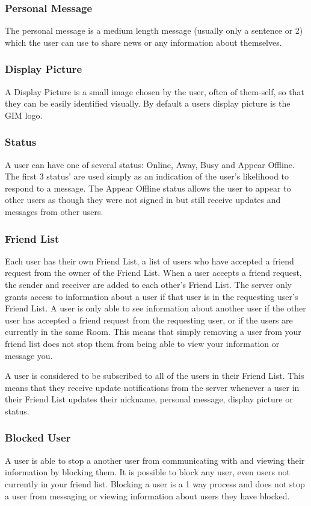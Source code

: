 \subsubsection{Personal Message}
The personal message is a medium length message (usually only a sentence or 2) which the user can use to share news or any information about themselves.

\subsubsection{Display Picture}
A Display Picture is a small image chosen by the user, often of them-self, so that they can be easily identified visually. By default a users display picture is the GIM logo. 

\subsubsection{Status}
A user can have one of several status: Online, Away, Busy and Appear Offline. The first 3 status' are used simply as an indication of the user's likelihood to respond to a message. The Appear Offline status allows the user to appear to other users as though they were not signed in but still receive updates and messages from other users.

\subsubsection{Friend List}
Each user has their own Friend List, a list of users who have accepted a friend request from the owner of the Friend List. When a user accepts a friend request, the sender and receiver are added to each other's Friend List. The server only grants access to information about a user if that user is in the requesting user's Friend List. A user is only able to see information about another user if the other user has accepted a friend request from the requesting user, or if the users are currently in the same Room. This means that simply removing a user from your friend list does not stop them from being able to view your information or message you. 

A user is considered to be subscribed to all of the users in their Friend List. This means that they receive update notifications from the server whenever a user in their Friend List updates their nickname, personal message, display picture or status.

\subsubsection{Blocked User}
A user is able to stop a another user from communicating with and viewing their information by blocking them. It is possible to block any user, even users not currently in your friend list. Blocking a user is a 1 way process and does not stop a user from messaging or viewing information about users they have blocked.

